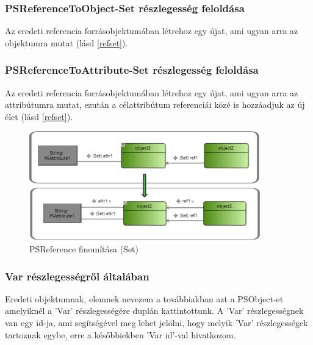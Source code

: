 \subsubsection{PSReferenceToObject-Set részlegesség feloldása}
Az eredeti referencia forrásobjektumában létrehoz egy újat, ami ugyan arra az objektumra mutat (lásd \autoref{refset}).

\subsubsection{PSReferenceToAttribute-Set részlegesség feloldása}
Az eredeti referencia forrásobjektumában létrehoz egy újat, ami ugyan arra az attribútumra mutat, ezután a célattribútum referenciái közé is hozzáadjuk az új élet (lásd \autoref{refset}).
\begin{figure}[!ht]
	\centering
	\includegraphics[width=100mm]{figures/refset.pdf}
	\caption{PSReference finomítása (Set)}
	\label{refset} 
\end{figure}

\subsubsection{Var részlegességről általában}
Eredeti objektumnak, elemnek nevezem a továbbiakban azt a PSObject-et amelyiknél a 'Var' részlegességére duplán kattintottunk. A 'Var' részlegességnek van egy id-ja, ami segítségével meg lehet jelölni, hogy melyik 'Var' részlegességek tartoznak egybe, erre a későbbiekben 'Var id'-val hivatkozom.


